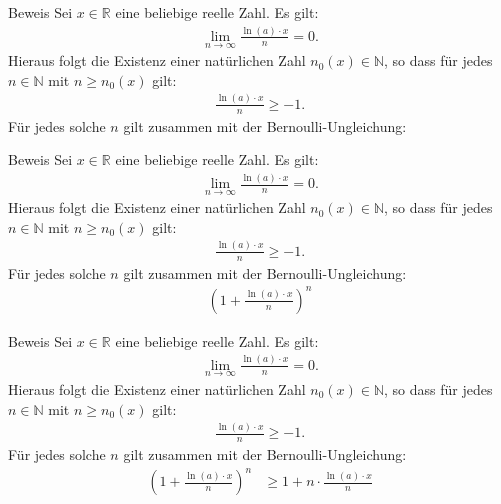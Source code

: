 \documentclass[10pt]{beamer}
\def\bN{\mathbb{N}}
\def\bR{\mathbb{R}}
\begin{document}
\begin{frame}{Beweis}
    Sei \( x \in \bR \) eine beliebige reelle Zahl. Es gilt:
    \begin{align*}
        \lim_{n \to \infty} \frac{\ln( a ) \cdot x}{n} = 0. 
    \end{align*}
    Hieraus folgt die Existenz einer natürlichen Zahl \( n_{0}(x) \in \bN \), so dass für jedes \( n \in \bN \) mit \( n \geq n_{0}(x) \) gilt:
    \begin{align*}
        \frac{\ln( a ) \cdot x}{n} 
        \geq - 1.
    \end{align*}
    Für jedes solche \( n \) gilt zusammen mit der Bernoulli-Ungleichung:
\end{frame}



\begin{frame}{Beweis}
    Sei \( x \in \bR \) eine beliebige reelle Zahl. Es gilt:
    \begin{align*}
        \lim_{n \to \infty} \frac{\ln( a ) \cdot x}{n} = 0. 
    \end{align*}
    Hieraus folgt die Existenz einer natürlichen Zahl \( n_{0}(x) \in \bN \), so dass für jedes \( n \in \bN \) mit \( n \geq n_{0}(x) \) gilt:
    \begin{align*}
        \frac{\ln( a ) \cdot x}{n} 
        \geq - 1.
    \end{align*}
    Für jedes solche \( n \) gilt zusammen mit der Bernoulli-Ungleichung:
    \begin{align*}
        \left( 1 + \frac{\ln( a ) \cdot x}{n} \right)^{n}
    \end{align*}
\end{frame}



\begin{frame}{Beweis}
    Sei \( x \in \bR \) eine beliebige reelle Zahl. Es gilt:
    \begin{align*}
        \lim_{n \to \infty} \frac{\ln( a ) \cdot x}{n} = 0. 
    \end{align*}
    Hieraus folgt die Existenz einer natürlichen Zahl \( n_{0}(x) \in \bN \), so dass für jedes \( n \in \bN \) mit \( n \geq n_{0}(x) \) gilt:
    \begin{align*}
        \frac{\ln( a ) \cdot x}{n} 
        \geq - 1.
    \end{align*}
    Für jedes solche \( n \) gilt zusammen mit der Bernoulli-Ungleichung:
    \begin{align*}
        \left( 1 + \frac{\ln( a ) \cdot x}{n} \right)^{n}
        & \geq 1 + n \cdot \frac{\ln( a ) \cdot x}{n}
    \end{align*}
\end{frame}
\end{document}
